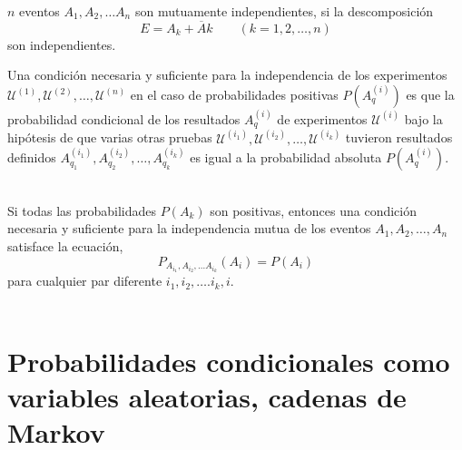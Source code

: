\begin{tcolorbox}[colframe=white]
    \begin{def.} $n$ eventos $A_1,A_2,\ldots A_n$ son mutuamente independientes, si la descomposición
	$$E=A_k+\overline{A}k \qquad (k=1,2,\ldots , n)$$
	son independientes.
    \end{def.}
\end{tcolorbox}

\begin{teo} Una condición necesaria y suficiente para la independencia de los experimentos $\mathcal{U}^{(1)}, \mathcal{U}^{(2)}, \ldots , \mathcal{U}^{(n)}$ en el caso de probabilidades positivas $P\left(A_q^{(i)}\right)$ es que la probabilidad condicional de los resultados $A_q^{(i)}$ de experimentos $\mathcal{U}^{(i)}$ bajo la hipótesis de que varias otras pruebas $\mathcal{U}^{(i_1)}, \mathcal{U}^(i_2),\ldots, \mathcal{U}^{(i_k)}$ tuvieron resultados definidos $A_{q_1}^{(i_1)},A_{q_2}^{(i_2)},\ldots, A_{q_k}^{(i_k)}$ es igual a la probabilidad absoluta $P(A_q^{(i)})$.\\\\
\end{teo}

\begin{teo} Si todas las probabilidades $P(A_k)$ son positivas, entonces una condición necesaria y suficiente para la independencia mutua de los eventos $A_1,A_2, \ldots, A_n$ satisface la ecuación,
    $$P_{A_{i_1},A_{i_2},\ldots A_{i_k}}(A_i) = P(A_i)$$
    para cualquier par diferente $i_1,i_2,\ldots. i_k,i$.\\\\
\end{teo}

\section{Probabilidades condicionales como variables aleatorias, cadenas de Markov}
